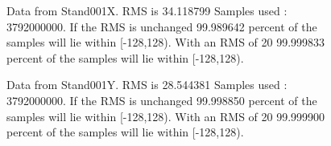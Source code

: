 \begin{figure}[ht] 				 				 				\caption{Data from Stand001X. RMS is 34.118799 Samples used : 3792000000. If the RMS is unchanged 99.989642 percent of the samples will lie within [-128,128).  				 With an RMS of 20 99.999833 percent of the samples will lie within [-128,128).} 				\end{figure} 

\begin{figure}[ht] 				 				 				\caption{Data from Stand001Y. RMS is 28.544381 Samples used : 3792000000. If the RMS is unchanged 99.998850 percent of the samples will lie within [-128,128).  				 With an RMS of 20 99.999900 percent of the samples will lie within [-128,128).} 				\end{figure} 


